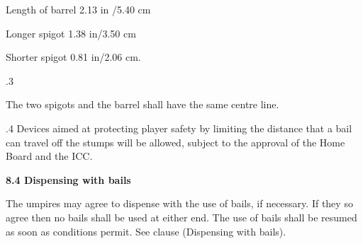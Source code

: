 \documentclass[12pt]{article}
\begin{document}
\vspace{\baselineskip}
\begin{adjustwidth}{0.5in}{0.0in}
{\fontsize{9pt}{10.8pt}\selectfont Length of barrel 2.13 in /5.40 cm\par}\par

\end{adjustwidth}


\vspace{\baselineskip}
\begin{adjustwidth}{0.5in}{0.0in}
{\fontsize{9pt}{10.8pt}\selectfont Longer spigot 1.38 in/3.50 cm\par}\par

\end{adjustwidth}


\vspace{\baselineskip}
\begin{adjustwidth}{0.5in}{0.0in}
{\fontsize{9pt}{10.8pt}\selectfont Shorter spigot 0.81 in/2.06 cm.\par}\par

\end{adjustwidth}


\vspace{\baselineskip}
{\fontsize{9pt}{10.8pt}.3 \tabto{0.49in} {\fontsize{8pt}{9.6pt}\selectfont The two spigots and the barrel shall have the same centre line.\par}\par}\par


\vspace{\baselineskip}
\begin{adjustwidth}{0.5in}{0.07in}
{\fontsize{9pt}{10.8pt}.4 \tabto{0.49in} Devices aimed at protecting player safety by limiting the distance that a bail can travel off the stumps will be allowed, subject to the approval of the Home Board and the ICC.\par}\par

\end{adjustwidth}


\vspace{\baselineskip}
{\fontsize{11pt}{13.2pt}\selectfont \textbf{8.4 \tabto{0.47in} Dispensing with bails}\par}\par


\vspace{\baselineskip}
\begin{adjustwidth}{0.0in}{0.06in}
{\fontsize{8pt}{9.6pt}\selectfont The umpires may agree to dispense with the use of bails, if necessary. If they so agree then no bails shall be used at either end. The use of bails shall be resumed as soon as conditions permit. See clause (Dispensing with bails).\par}\par

\end{adjustwidth}
\end{document}
